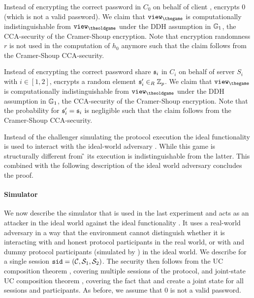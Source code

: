 \Gh Instead of encrypting the correct password \pwd in $C_0$ on behalf of client \Client, \Challenger encrypts $0$ (which is not a valid password).
We claim that $\view_{\thegame}$ is computationally indistinguishable from $\view_{\theoldgame}$ under the \ac{DDH} assumption in $\mathbb{G}_1$, \ie the \ac{CCA}-security of the Cramer-Shoup encryption.
Note that encryption randomness $r$ is not used in the computation of $h_0$ anymore such that the claim follows from the Cramer-Shoup \ac{CCA}-security.

\Gh Instead of encrypting the correct password share $\mathfrak{s}_i$ in $C_i$ on behalf of server $S_i$ with $i\in[1,2]$, \Challenger encrypts a random element $\mathfrak{s}'_i\in_R\mathbb{Z}_p$.
We claim that $\view_{\thegame}$ is computationally indistinguishable from $\view_{\theoldgame}$ under the \ac{DDH} assumption in $\mathbb{G}_1$, \ie the \ac{CCA}-security of the Cramer-Shoup encryption.
Note that the probability for $\mathfrak{s}'_i=\mathfrak{s}_i$ is negligible such that the claim follows from the Cramer-Shoup \ac{CCA}-security.

\Gh Instead of the challenger \Challenger simulating the protocol execution the ideal functionality \FTWOPAKE is used to interact with the ideal-world adversary \SIM.
While this game is structurally different from \G{\theoldgame} its execution is indistinguishable from the latter.
This combined with the following description of the ideal world adversary \SIM concludes the proof.


\paragraph{Simulator}
We now describe the simulator \SIM that is used in the last experiment and acts as an attacker in the ideal world against the ideal functionality \FTWOPAKE.
It uses a real-world adversary \cA in a way that the environment \cZ cannot  distinguish whether it is interacting with \cA and honest protocol participants in the real world, or with \SIM and dummy protocol participants (simulated by \FTWOPAKE) in the ideal world.
We describe \SIM for a single session $\mathtt{sid}=(\mathcal{C}, \mathcal{S}_1, \mathcal{S}_2)$.
The security then follows from the \ac{UC} composition theorem \cite{Canetti2001a}, covering multiple sessions of the protocol, and joint-state \ac{UC} composition theorem \cite{CanettiR03}, covering the fact that \Fca and \Fcrs create a joint state for all sessions and participants.
As before, we assume that $0$ is not a valid password.

